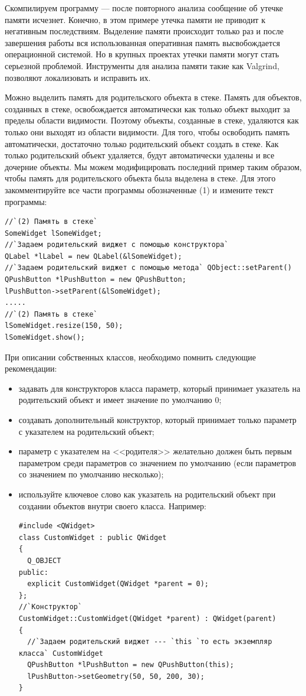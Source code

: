 Скомпилируем программу --- после повторного анализа сообщение об утечке памяти исчезнет. Конечно, в этом примере утечка
памяти не приводит к негативным последствиям. Выделение памяти происходит только раз и после завершения работы вся
использованная оперативная память высвобождается операционной системой. Но в крупных проектах утечки памяти могут стать
серьезной проблемой. Инструменты для анализа памяти такие как Valgrind, позволяют локализовать и исправить их.

Можно выделить память для родительского объекта в стеке. Память для объектов, созданных в стеке, освобождается
автоматически как только объект выходит за пределы области видимости. Поэтому объекты, созданные в стеке, удаляются как
только они выходят из области видимости. Для того, чтобы освободить память автоматически, достаточно только
родительский объект создать в стеке. Как только родительский объект удаляется, будут автоматически удалены и все
дочерние объекты. Мы можем модифицировать последний пример таким образом, чтобы память для родительского объекта была
выделена в стеке. Для этого закомментируйте все части программы обозначенные (1) и измените текст
программы:
\begin{lstlisting}
//`(2) Память в стеке`
SomeWidget lSomeWidget;
//`Задаем родительский виджет с помощью конструктора`
QLabel *lLabel = new QLabel(&lSomeWidget);
//`Задаем родительский виджет с помощью метода` QObject::setParent()
QPushButton *lPushButton = new QPushButton;
lPushButton->setParent(&lSomeWidget);
.....
//`(2) Память в стеке`
lSomeWidget.resize(150, 50);
lSomeWidget.show();
\end{lstlisting}

При описании собственных классов, необходимо помнить следующие рекомендации:

\begin{itemize}
\item задавать для конструкторов класса параметр, который принимает указатель на родительский объект и имеет значение по
умолчанию 0;
\item создавать дополнительный конструктор, который принимает только параметр с указателем на родительский объект;
\item параметр с указателем на <<родителя>> желательно должен быть первым параметром среди параметров со
значением по умолчанию (если параметров со значением по умолчанию несколько);
\item используйте ключевое слово  как указатель на родительский объект при создании объектов внутри своего
класса. Например:
\begin{lstlisting}
#include <QWidget>
class CustomWidget : public QWidget
{
  Q_OBJECT
public:
  explicit CustomWidget(QWidget *parent = 0);
};
//`Конструктор`
CustomWidget::CustomWidget(QWidget *parent) : QWidget(parent)
{
  //`Задаем родительский виджет --- `this `то есть экземпляр класса` CustomWidget
  QPushButton *lPushButton = new QPushButton(this); 
  lPushButton->setGeometry(50, 50, 200, 30);
}
\end{lstlisting}
\end{itemize}

